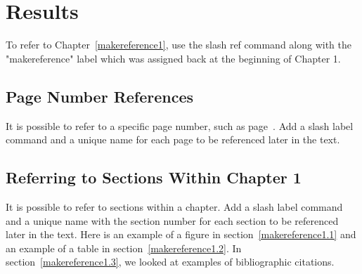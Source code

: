 
\cleardoublepage


\chapter{Results}
\label{makereference2}

To refer to Chapter~\ref{makereference1}, use the slash ref command
along with the "makereference" label which was assigned back at the
beginning of Chapter 1.

\section{Page Number References}
\label{makereference2.1} It is possible to refer to a specific page
number, such as page~\pageref{makereference1}.  Add a slash label
command and a unique name for each page to be referenced later in
the text.

\section{Referring to Sections Within Chapter 1}
\label{makereference2.2} It is possible to refer to sections within
a chapter.  Add a slash label command and a unique name with the
section number for each section to be referenced later in the text.
Here is an example of a figure in section~\ref{makereference1.1} and
an example of a table in section~\ref{makereference1.2}.  In
section~\ref{makereference1.3}, we looked at examples of
bibliographic citations.
